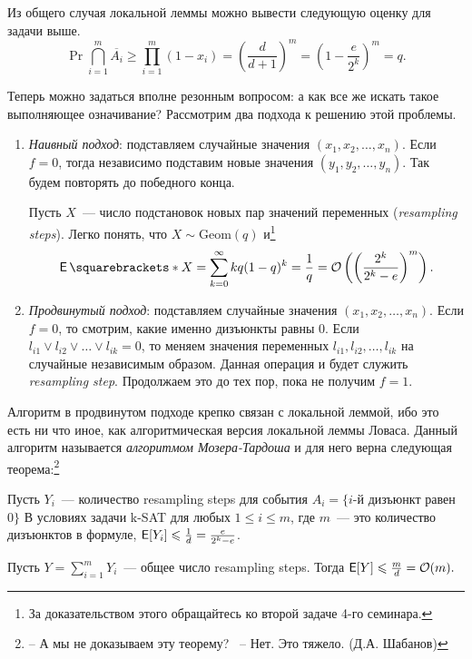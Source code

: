 Из общего случая локальной леммы можно вывести следующую оценку для задачи выше. 
\[\Pr{\bigcap\limits_{i = 1}^{m}\overline{A_i}} \geq \prod\limits_{i = 1}^{m}(1 - x_i) = \left(\frac{d}{d+1}\right)^{m} = \left(1 - \frac{e}{2^k} \right)^{m} = q.\]

Теперь можно задаться вполне резонным вопросом: а как все же искать такое выполняющее означивание? Рассмотрим два подхода к решению этой проблемы.
\begin{enumerate}
    \item \emph{Наивный подход}: подставляем случайные значения \((x_1, x_2, \dots, x_n )\). Если \(f = 0\), тогда независимо подставим новые значения \((y_1, y_2, \dots, y_n)\). Так будем повторять до победного конца.
    
    Пусть \(X\)~--- число подстановок новых пар значений переменных (\emph{resampling steps}). Легко понять, что \(X \sim \mathrm{Geom}(q)\) и\footnote{За доказательством этого обращайтесь ко второй задаче 4-го семинара.}
    \[\E{X} = \sum_{k = 0}^{\infty} kq(1 - q)^{k} = \frac{1}{q} = \mathcal{O}\left(\left(\frac{2^k}{2^k - e}\right)^{m}\right).\]
    
    \item \emph{Продвинутый подход}: подставляем случайные значения \((x_1, x_2, \dots, x_n )\). Если \(f = 0\), то смотрим, какие именно дизъюнкты равны 0. Если \(l_{i1} \lor l_{i2} \lor \dots \lor l_{ik} = 0\), то меняем значения переменных \(l_{i1}, l_{i2}, \dots, l_{ik}\) на случайные независимым образом. Данная операция и будет служить \emph{resampling step}. Продолжаем это до тех пор, пока не получим \(f = 1\).
\end{enumerate}

Алгоритм в продвинутом подходе крепко связан с локальной леммой, ибо это есть ни что иное, как алгоритмическая версия локальной леммы Ловаса. Данный алгоритм называется \emph{алгоритмом Мозера-Тардоша} и для него верна следующая теорема:\footnote{-- А мы не доказываем эту теорему? \ -- Нет. Это тяжело. (Д.А. Шабанов)}

\begin{theorem}
    Пусть \(Y_i\)~--- количество resampling steps для события \(A_i  = \{i\)-й дизъюнкт равен \(0\}\) В условиях задачи \textsf{k-SAT} для любых \(1 \leq  i \leq m \), где \(m\)~--- это количество дизъюнктов в формуле, \(\E[Y_i] \leq \frac{1}{d} = \frac{e}{2^k - e}\).
    
    Пусть \(Y = \sum\limits_{i = 1}^{m}Y_i \)~--- общее число resampling steps. Тогда \(\E[Y] \leq \frac{m}{d} = \mathcal{O}(m). \)
\end{theorem}

